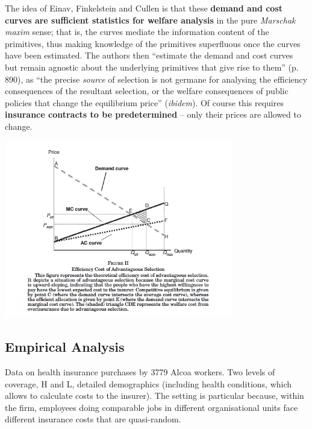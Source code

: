 \documentclass[11pt]{article}
\numberwithin{equation}{section}
\begin{document}
The idea of Einav, Finkelstein and Cullen is that these \textbf{demand and cost curves are sufficient statistics for welfare analysis} in the pure \textit{Marschak maxim} sense; that is, the curves mediate the information content of the primitives, thus making knowledge of the primitives superfluous once the curves have been estimated.
The authors then ``estimate the demand and cost curves but remain agnostic about the underlying primitives that give rise to them'' (p. 890), as ``the precise \textit{source} of selection is not germane for analysing the efficiency consequences of the resultant selection, or the welfare consequences of public policies that change the equilibrium price'' (\textit{ibidem}).
Of course this requires \textbf{insurance contracts to be predetermined} -- only their prices are allowed to change.

\begin{center}
	\includegraphics[width=0.75\textwidth]{p2}
\end{center}

\subsection{Empirical Analysis}
Data on health insurance purchases by 3779 Alcoa workers. Two levels of coverage, H and L, detailed demographics (including health conditions, which allows to calculate costs to the insurer). The setting is particular because, within the firm, employees doing comparable jobs in different organisational units face different insurance costs that are quasi-random.
\end{document}
